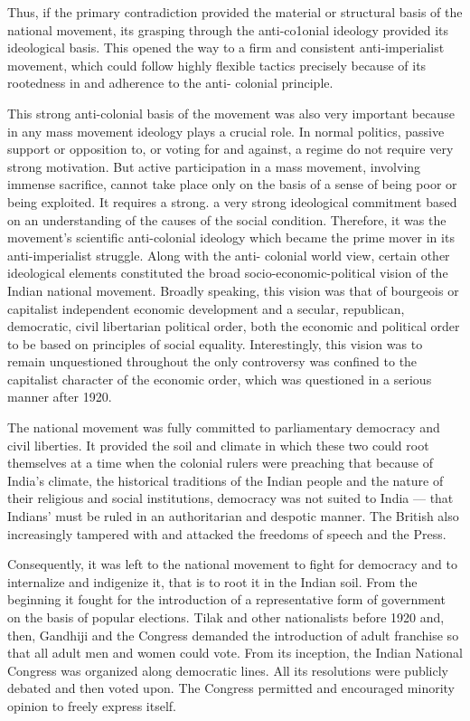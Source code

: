 \begin{multicols}{2}
Thus, if the primary contradiction provided the material or structural basis of the national movement, its grasping through the anti-co1onial ideology provided its ideological basis. This opened the way to a firm and consistent anti-imperialist movement, which could follow highly flexible tactics precisely because of its rootedness in and adherence to the anti- colonial principle.

This strong anti-colonial basis of the movement was also very important because in any mass movement ideology plays a crucial role. In normal politics, passive support or opposition to, or voting for and against, a regime do not require very strong motivation. But active participation in a mass movement, involving immense sacrifice, cannot take place only on the basis of a sense of being poor or being exploited. It requires a strong. a very strong ideological commitment based on an understanding of the causes of the social condition. Therefore, it was the movement's scientific anti-colonial ideology which became the prime mover in its anti-imperialist struggle. Along with the anti- colonial world view, certain other ideological elements constituted the broad socio-economic-political vision of the Indian national movement. Broadly speaking, this vision was that of bourgeois or capitalist independent economic development and a secular, republican, democratic, civil libertarian political order, both the economic and political order to be based on principles of social equality. Interestingly, this vision was to remain unquestioned throughout the only controversy was confined to the capitalist character of the economic order, which was questioned in a serious manner after 1920.

The national movement was fully committed to parliamentary democracy and civil liberties. It provided the soil and climate in which these two could root themselves at a time when the colonial rulers were preaching that because of India's climate, the historical traditions of the Indian people and the nature of their religious and social institutions, democracy was not suited to India --- that Indians' must be ruled in an authoritarian and despotic manner. The British also increasingly tampered with and attacked the freedoms of speech and the Press.

Consequently, it was left to the national movement to fight for democracy and to internalize and indigenize it, that is to root it in the Indian soil. From the beginning it fought for the introduction of a representative form of government on the basis of popular elections. Tilak and other nationalists before 1920 and, then, Gandhiji and the Congress demanded the introduction of adult franchise so that all adult men and women could vote. From its inception, the Indian National Congress was organized along democratic lines. All its resolutions were publicly debated and then voted upon. The Congress permitted and encouraged minority opinion to freely express itself.


\end{multicols}
